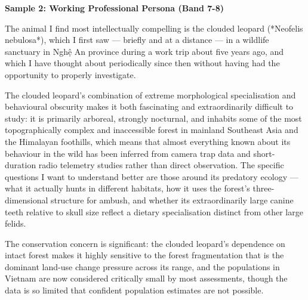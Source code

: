 \begin{ieltsanswer}
\textbf{Sample 2: Working Professional Persona (Band 7-8)}

The animal I find most intellectually compelling is the clouded leopard (*Neofelis nebulosa*), which I first saw — briefly and at a distance — in a wildlife sanctuary in Nghệ An province during a work trip about five years ago, and which I have thought about periodically since then without having had the opportunity to properly investigate.

The clouded leopard's combination of extreme morphological specialisation and behavioural obscurity makes it both fascinating and extraordinarily difficult to study: it is primarily arboreal, strongly nocturnal, and inhabits some of the most topographically complex and inaccessible forest in mainland Southeast Asia and the Himalayan foothills, which means that almost everything known about its behaviour in the wild has been inferred from camera trap data and short-duration radio telemetry studies rather than direct observation. The specific questions I want to understand better are those around its predatory ecology — what it actually hunts in different habitats, how it uses the forest's three-dimensional structure for ambush, and whether its extraordinarily large canine teeth relative to skull size reflect a dietary specialisation distinct from other large felids.

The conservation concern is significant: the clouded leopard's dependence on intact forest makes it highly sensitive to the forest fragmentation that is the dominant land-use change pressure across its range, and the populations in Vietnam are now considered critically small by most assessments, though the data is so limited that confident population estimates are not possible.
\end{ieltsanswer}


